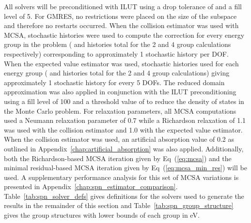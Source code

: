 \documentclass[letterpaper,12pt]{article}
\begin{document}
All solvers will be preconditioned with ILUT using a drop tolerance of
 and a fill level of 5. For GMRES, no restrictions were
placed on the size of the subspace and therefore no restarts
occurred. When the collision estimator was used with MCSA, 
stochastic histories were used to compute the correction for every
energy group in the problem ( and  histories total
for the 2 and 4 group calculations respectively) corresponding to
approximately 1 stochastic history per DOF. When the expected value
estimator was used,  stochastic histories used for each
energy group ( and  histories total for the 2 and
4 group calculations) giving approximately 1 stochastic history for
every 5 DOFs. The reduced domain approximation was also applied in
conjunction with the ILUT preconditioning using a fill level of 100
and a threshold value of  to reduce the density of states
in the Monte Carlo problem. For relaxation parameters, all MCSA
computations used a Neumann relaxation parameter of 0.7 while a
Richardson relaxation of 1.1 was used with the collision estimator and
1.0 with the expected value estimator. When the collision estimator
was used, an artificial absorption value of 0.2 as outlined in
Appendix~\ref{chap:artificial_absorption} was also
applied. Additionally, both the Richardson-based MCSA iteration given
by Eq~(\ref{eq:mcsa}) and the minimal residual-based MCSA iteration
given by Eq~(\ref{eq:mcsa_min_res}) will be used. A supplementary
performance analysis for this set of MCSA variations is presented in
Appendix~\ref{chap:spn_estimator_comparison}. Table~\ref{tab:spn_solver_defs}
gives definitions for the solvers used to generate the results in the
remainder of this section and Table~\ref{tab:spn_group_structure}
gives the group structures with lower bounds of each group in eV.
\end{document}
